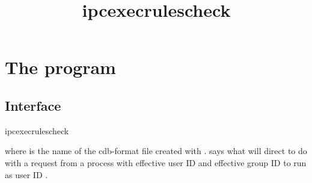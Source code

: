 \documentclass{book}
\title{ipcexecrulescheck}
\begin{document}
\section{The  program}

\subsection{Interface}
\begin{code}%
  ipcexecrulescheck 
\end{code}
where  is the name of the cdb-format file created with
.   says what  will
direct  to do with a request from a process with effective
user ID  and effective group ID
 to run  as user ID
.
\end{document}
